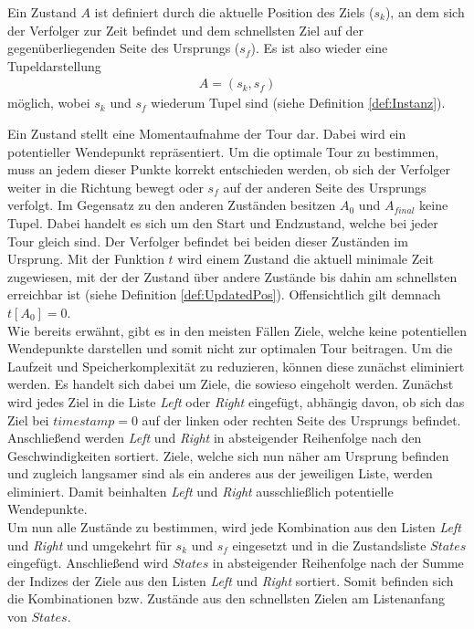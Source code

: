 \documentclass[german,version-2019-11]{uzl-thesis}
\begin{document}
\begin{definition}
Ein Zustand $A$ ist definiert durch die aktuelle Position des Ziels ($s_k$), an dem sich der Verfolger zur Zeit befindet und dem schnellsten Ziel auf der gegenüberliegenden Seite des Ursprungs ($s_f$). Es ist also wieder eine Tupeldarstellung
\begin{align*}
A = (s_k, s_f)
\end{align*}
möglich, wobei $s_k$ und $s_f$ wiederum Tupel sind (siehe Definition \ref{def:Instanz}).
\end{definition}\noindent
Ein Zustand stellt eine Momentaufnahme der Tour dar. Dabei wird ein potentieller Wendepunkt repräsentiert. Um die optimale Tour zu bestimmen, muss an jedem dieser Punkte korrekt entschieden werden, ob sich der Verfolger weiter in die Richtung bewegt oder $s_f$ auf der anderen Seite des Ursprungs verfolgt. Im Gegensatz zu den anderen Zuständen besitzen $A_0$ und $A_{final}$ keine Tupel. Dabei handelt es sich um den Start und Endzustand, welche bei jeder Tour gleich sind. Der Verfolger befindet bei beiden dieser Zuständen im Ursprung. 
Mit der Funktion $t$ wird einem Zustand die aktuell minimale Zeit zugewiesen, mit der der Zustand über andere Zustände bis dahin am schnellsten erreichbar ist (siehe Definition \ref{def:UpdatedPos}). Offensichtlich gilt demnach $t[A_0] = 0$. \\
Wie bereits erwähnt, gibt es in den meisten Fällen Ziele, welche keine potentiellen Wendepunkte darstellen und somit nicht zur optimalen Tour beitragen. Um die Laufzeit und Speicherkomplexität zu reduzieren, können diese zunächst eliminiert werden. Es handelt sich dabei um Ziele, die sowieso eingeholt werden. Zunächst wird jedes Ziel in die Liste \emph{Left} oder \emph{Right} eingefügt, abhängig davon, ob sich das Ziel bei $timestamp = 0$ auf der linken oder rechten Seite des Ursprungs befindet. Anschließend werden \emph{Left} und \emph{Right} in absteigender Reihenfolge nach den Geschwindigkeiten sortiert. Ziele, welche sich nun näher am Ursprung befinden
und zugleich langsamer sind als ein anderes aus der jeweiligen Liste, werden eliminiert. Damit beinhalten \emph{Left} und \emph{Right} ausschließlich potentielle Wendepunkte. \\
Um nun alle Zustände zu bestimmen, wird jede Kombination aus den Listen \emph{Left} und \emph{Right} und umgekehrt für $s_k$ und $s_f$ eingesetzt und in die Zustandsliste $States$ eingefügt. Anschließend wird $States$ in absteigender Reihenfolge nach der Summe der Indizes der Ziele aus den Listen \emph{Left} und \emph{Right} sortiert. Somit befinden sich die Kombinationen bzw. Zustände aus den schnellsten Zielen am Listenanfang von $States$.\\
\end{document}
